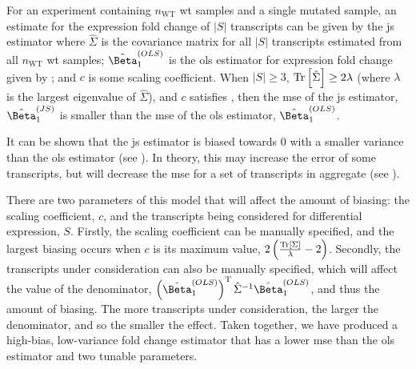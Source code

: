\begin{theorem}
  For an experiment containing $n_\mathrm{WT}$ \gls{wt} samples and a single mutated sample, an estimate for the expression fold change of $|S|$ transcripts can be given by the \gls{js} estimator  where $\hat{\Sigma}$ is the covariance matrix for all $|S|$ transcripts estimated from all $n_\mathrm{WT}$ \gls{wt} samples; $\hat{\Beta}_1^{(OLS)}$ is the \gls{ols} estimator for expression fold change given by ; and $c$ is some scaling coefficient.
  When $|S| \ge 3$, $\mathrm{Tr} \left[ \hat{\Sigma} \right] \ge 2\lambda$ (where $\lambda$ is the largest eigenvalue of $\hat{\Sigma}$), and $c$ satisfies , then the \gls{mse} of the \gls{js} estimator, $\hat{\Beta}_1^{(JS)}$ is smaller than the \gls{mse} of the \gls{ols} estimator, $\hat{\Beta}_1^{(OLS)}$.
\end{theorem}

It can be shown that the \gls{js} estimator is biased towards 0 with a smaller variance than the \gls{ols} estimator (see ).
In theory, this may increase the error of some transcripts, but will decrease the \gls{mse} for a set of transcripts in aggregate (see ).

There are two parameters of this model that will affect the amount of biasing: the scaling coefficient, $c$, and the transcripts being considered for differential expression, $S$.
Firstly, the scaling coefficient can be manually specified, and the largest biasing occurs when $c$ is its maximum value, $2 \left( \frac{\mathrm{Tr} \left[ \Sigma \right]}{\lambda} - 2 \right)$.
Secondly, the transcripts under consideration can also be manually specified, which will affect the value of the denominator, $\left( \hat{\Beta}_1^{(OLS)} \right)^\tran \hat{\Sigma}^{-1} \hat{\Beta}_1^{(OLS)}$, and thus the amount of biasing.
The more transcripts under consideration, the larger the denominator, and so the smaller the effect.
Taken together, we have produced a high-bias, low-variance fold change estimator that has a lower \gls{mse} than the \gls{ols} estimator and two tunable parameters.
